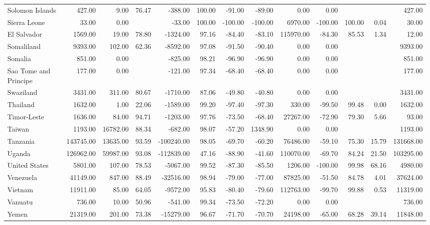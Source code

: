 \begin{table}[ht]
\begin{tabular}{lrrrrrrrrrrrr}
  Solomon Islands & 427.00 & 9.00 & 76.47 & -388.00 & 100.00 & -91.00 & -89.00 & 0.00 & 0.00 &  &  & 427.00 \\ 
  Sierra Leone & 33.00 & 0.00 &  & -33.00 & 100.00 & -100.00 & -100.00 & 6970.00 & -100.00 & 100.00 & 0.04 & 30.00 \\ 
  El Salvador & 1569.00 & 19.00 & 78.80 & -1324.00 & 97.16 & -84.40 & -83.10 & 115970.00 & -84.30 & 85.53 & 1.34 & 12.00 \\ 
  Somaliland & 9393.00 & 102.00 & 62.36 & -8592.00 & 97.08 & -91.50 & -90.40 & 0.00 & 0.00 &  &  & 9393.00 \\ 
  Somalia & 851.00 & 0.00 &  & -825.00 & 98.21 & -96.90 & -96.90 & 0.00 & 0.00 &  &  & 851.00 \\ 
  Sao Tome and Principe & 177.00 & 0.00 &  & -121.00 & 97.34 & -68.40 & -68.40 & 0.00 & 0.00 &  &  & 177.00 \\ 
  Swaziland & 3431.00 & 311.00 & 80.67 & -1710.00 & 87.06 & -49.80 & -40.80 & 0.00 & 0.00 &  &  & 3431.00 \\ 
  Thailand & 1632.00 & 1.00 & 22.06 & -1589.00 & 99.20 & -97.40 & -97.30 & 330.00 & -99.50 & 99.48 & 0.00 & 1632.00 \\ 
  Timor-Leste & 1636.00 & 84.00 & 94.71 & -1203.00 & 97.76 & -73.50 & -68.40 & 27267.00 & -72.90 & 79.30 & 5.66 & 93.00 \\ 
  Taiwan & 1193.00 & 16782.00 & 88.34 & -682.00 & 98.07 & -57.20 & 1348.90 & 0.00 & 0.00 &  &  & 1193.00 \\ 
  Tanzania & 143745.00 & 13635.00 & 93.59 & -100240.00 & 98.05 & -69.70 & -60.20 & 76486.00 & -59.10 & 75.30 & 15.79 & 131668.00 \\ 
  Uganda & 126962.00 & 59987.00 & 93.08 & -112839.00 & 47.16 & -88.90 & -41.60 & 110070.00 & -69.70 & 84.24 & 21.50 & 103295.00 \\ 
  United States & 5801.00 & 107.00 & 78.53 & -5067.00 & 99.52 & -87.30 & -85.50 & 1206.00 & -100.00 & 99.98 & 68.16 & 4980.00 \\ 
  Venezuela & 41149.00 & 847.00 & 88.49 & -32516.00 & 98.94 & -79.00 & -77.00 & 87825.00 & -51.50 & 84.78 & 4.01 & 37624.00 \\ 
  Vietnam & 11911.00 & 85.00 & 64.05 & -9572.00 & 95.83 & -80.40 & -79.60 & 112763.00 & -99.70 & 99.88 & 0.53 & 11319.00 \\ 
  Vanuatu & 736.00 & 10.00 & 50.96 & -541.00 & 99.34 & -73.50 & -72.20 & 0.00 & 0.00 &  &  & 736.00 \\ 
  Yemen & 21319.00 & 201.00 & 73.38 & -15279.00 & 96.67 & -71.70 & -70.70 & 24198.00 & -65.00 & 68.28 & 39.14 & 11848.00 \\ 

\end{tabular}
\end{table}
